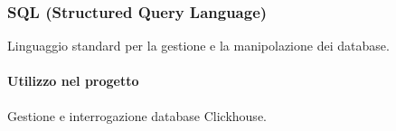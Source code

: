 \subsubsection{SQL (Structured Query Language)}
Linguaggio standard per la gestione e la manipolazione dei
database. 

\paragraph{Utilizzo nel progetto}
Gestione e interrogazione database Clickhouse.
